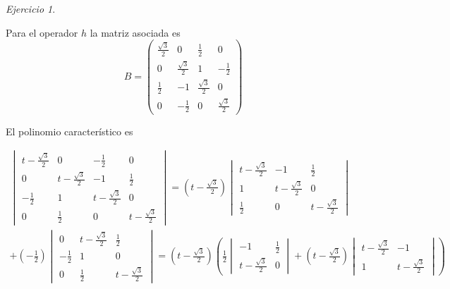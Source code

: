 \documentclass[11pt,a4paper]{article}
\theoremstyle{definition}
\theoremstyle{remark}
\newtheorem{exc}{Ejercicio}
\begin{document}
\begin{exc}
\begin{enumerate}
    Para el operador $ h $ la matriz asociada es \begin{equation}
    	B= \begin{pmatrix}
    	\frac{\sqrt{3}}{2} & 0 & \frac{1}{2} & 0
    	\\ 0 & \frac{\sqrt{3}}{2} & 1 & -\frac{1}{2} 
    	\\ \frac{1}{2} & -1 & \frac{\sqrt{3}}{2} & 0
    	\\ 0 & -\frac{1}{2} & 0 & \frac{\sqrt{3}}{2}
    	\end{pmatrix} \nonumber
    	\end{equation}
	
	El polinomio característico es
		
		\begin{multline}
		    	\begin{vmatrix}
		    	t-\frac{\sqrt{3}}{2} & 0 & -\frac{1}{2} & 0
		    	\\ 0 & t-\frac{\sqrt{3}}{2} & -1 & \frac{1}{2} 
		    	\\ -\frac{1}{2} & 1 & t-\frac{\sqrt{3}}{2} & 0
		    	\\ 0 & \frac{1}{2} & 0 & t-\frac{\sqrt{3}}{2}
		    	\end{vmatrix} = (t-\frac{\sqrt{3}}{2})
		    	\begin{vmatrix}
	 		    	t-\frac{\sqrt{3}}{2} & -1 & \frac{1}{2} 
	 		    	\\ 1 & t-\frac{\sqrt{3}}{2} & 0
	 		    	\\ \frac{1}{2} & 0 & t-\frac{\sqrt{3}}{2}
	 		    \end{vmatrix}\nonumber
	 		    \\+(-\frac{1}{2})\begin{vmatrix}
	 		    	    	0 & t-\frac{\sqrt{3}}{2} & \frac{1}{2} 
	 		    	    	\\ -\frac{1}{2} & 1 & 0
	 		    	    	\\ 0 & \frac{1}{2} &  t-\frac{\sqrt{3}}{2}
	 		    	    	\end{vmatrix} = (t-\frac{\sqrt{3}}{2})(\frac{1}{2}\begin{vmatrix}
	 		    	    	 		    	 -1 & \frac{1}{2} 
	 		    	    	 		    	\\t-\frac{\sqrt{3}}{2} & 0
	 		    	    	 		    \end{vmatrix}+(t-\frac{\sqrt{3}}{2})\begin{vmatrix}
	 		    	    	 		     		    	t-\frac{\sqrt{3}}{2} & -1 
	 		    	    	 		     		    	\\ 1 & t-\frac{\sqrt{3}}{2}
	 		    	    	 		     		    \end{vmatrix})\\

\end{multline}
\end{enumerate}
\end{exc}
\end{document}
